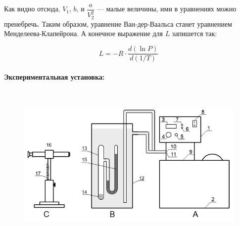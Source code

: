 \documentclass[a4paper, 12pt]{article}
\newcommand{\parag}[1]{\paragraph*{#1:}}
\begin{document}
Как видно отсюда, $V_1$, $b$, и $\dfrac{a}{V_2^2}$ --- малые величины, ими в уравнениях можно пренебречь. Таким образом, уравнение Ван-дер-Ваальса станет уравнением Менделеева-Клапейрона. А конечное выражение для $L$ запишется так:

\begin{equation} \label{eq:L}
    L = -R \cdot \frac{d(\ln P)}{d(1/T)}
\end{equation}

\parag {Экспериментальная установка} ~

\begin{figure}[!h]
    \includegraphics[scale = 0.4]{Workplace}
    \centering
\end{figure}



\renewcommand {\labelenumi}  {\Alph{enumi}.}
\renewcommand {\labelenumii} {\arabic{enumii}.}
\end{document}
